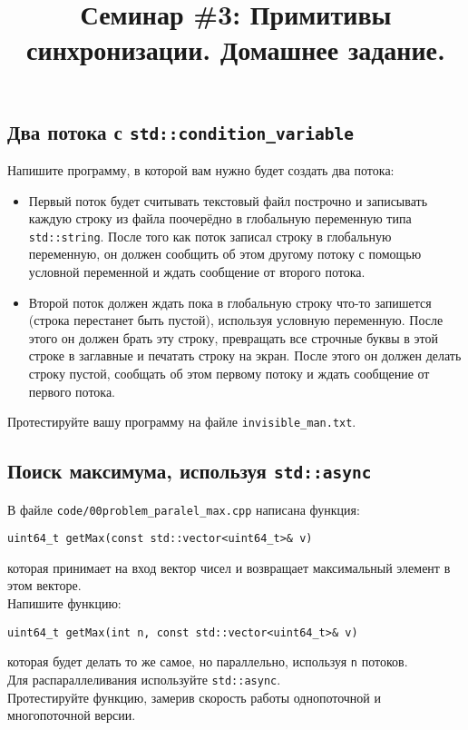 \documentclass{article}
\begin{document}
\title{Семинар \#3: Примитивы синхронизации. Домашнее задание.\vspace{-5ex}}\date{}\maketitle

\subsection{Два потока с \texttt{std::condition\_variable}}
Напишите программу, в которой вам нужно будет создать два потока:

\begin{itemize}
\item Первый поток будет считывать текстовый файл построчно и записывать каждую строку из файла поочерёдно в глобальную переменную типа \texttt{std::string}. После того как поток записал строку в глобальную переменную, он должен сообщить об этом другому потоку с помощью условной переменной и ждать сообщение от второго потока.

\item Второй поток должен ждать пока в глобальную строку что-то запишется (строка перестанет быть пустой), используя условную переменную. После этого он должен брать эту строку, превращать все строчные буквы в этой строке в заглавные и печатать строку на экран. После этого он должен делать строку пустой, сообщать об этом первому потоку и ждать сообщение от первого потока.
\end{itemize}
Протестируйте вашу программу на файле \texttt{invisible\_man.txt}.

\subsection{Поиск максимума, используя \texttt{std::async}}
В файле \texttt{code/00problem\_paralel\_max.cpp} написана функция:
\begin{lstlisting}
uint64_t getMax(const std::vector<uint64_t>& v)
\end{lstlisting}
которая принимает на вход вектор чисел и возвращает максимальный элемент в этом векторе.\\
Напишите функцию:
\begin{lstlisting}
uint64_t getMax(int n, const std::vector<uint64_t>& v)
\end{lstlisting}
которая будет делать то же самое, но параллельно, используя \texttt{n} потоков.\\
Для распараллеливания используйте \texttt{std::async}.\\
Протестируйте функцию, замерив скорость работы однопоточной и многопоточной версии.
\end{document}
